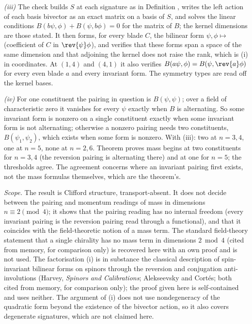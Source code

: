 \emph{(iii)} The check builds $S$ at each signature as in Definition , writes the left action of each basis bivector as an exact matrix on a basis of $S$, and solves the linear conditions $B(b\psi, \phi) + B(\psi, b\phi) = 0$ for the matrix of $B$; the kernel dimensions are those stated. It then forms, for every blade $C$, the bilinear form $\psi, \phi \mapsto$ (coefficient of $C$ in $\rev{\psi}\phi$), and verifies that these forms span a space of the same dimension and that adjoining the kernel does not raise the rank, which is (i) in coordinates. At $(1,4)$ and $(4,1)$ it also verifies $B(a\psi, \phi) = B(\psi, \rev{a}\phi)$ for every even blade $a$ and every invariant form. The symmetry types are read off the kernel bases.

\emph{(iv)} For one constituent the pairing in question is $B(\psi, \psi)$; over a field of characteristic zero it vanishes for every $\psi$ exactly when $B$ is alternating. So some invariant form is nonzero on a single constituent exactly when some invariant form is not alternating; otherwise a nonzero pairing needs two constituents, $B(\psi_{1}, \psi_{2})$, which exists when some form is nonzero. With (iii): two at $n = 3, 4$, one at $n = 5$, none at $n = 2, 6$. Theorem  proves mass begins at two constituents for $n = 3, 4$ (the reversion pairing is alternating there) and at one for $n = 5$; the thresholds agree. The agreement concerns where an invariant pairing first exists, not the mass formulas themselves, which are the theorem's.

\emph{Scope.} The result is Clifford structure, transport-absent. It does not decide between the pairing and momentum readings of mass in dimensions $n \equiv 2 \pmod 4$; it shows that the pairing reading has no internal freedom (every invariant pairing is the reversion pairing read through a functional), and that it coincides with the field-theoretic notion of a mass term. The standard field-theory statement that a single chirality has no mass term in dimensions $2 \bmod 4$ (cited from memory, for comparison only) is recovered here with an own proof and is not used. The factorisation (i) is in substance the classical description of spin-invariant bilinear forms on spinors through the reversion and conjugation anti-involutions (Harvey, \emph{Spinors and Calibrations}; Alekseevsky and Cort\'es; both cited from memory, for comparison only); the proof given here is self-contained and uses neither. The argument of (i) does not use nondegeneracy of the quadratic form beyond the existence of the bivector action, so it also covers degenerate signatures, which are not claimed here.
